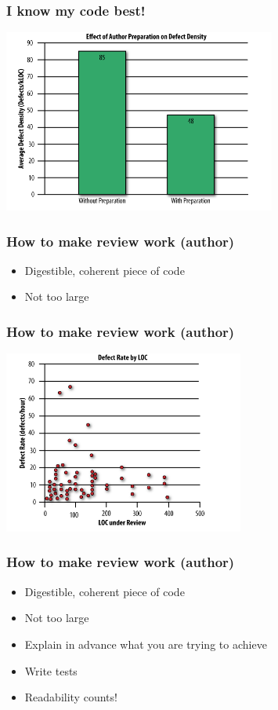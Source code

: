 \documentclass{beamer}
\begin{document}
\begin{frame}
\frametitle{I know my code best!}
\pause
\includegraphics[height=6cm]{figures/two_heads_better_than_one.png}
\end{frame}

\begin{frame}
\frametitle{How to make review work (author)}
\begin{itemize}
\pause
\item 
 Digestible, coherent piece of code
\pause
\item
Not too large
\end{itemize}
\end{frame}


\begin{frame}
\frametitle{How to make review work (author)}
\includegraphics[height=6cm]{figures/small_code_review.png}
\end{frame}


\begin{frame}
\frametitle{How to make review work (author)}
\begin{itemize}
\item 
 Digestible, coherent piece of code
\item
Not too large
\pause
\item
 Explain in advance what you are trying to achieve
\pause
\item 
 Write tests
\pause
\item
 Readability counts!\footnotemark[1]
\end{itemize}
\end{frame}
\end{document}
